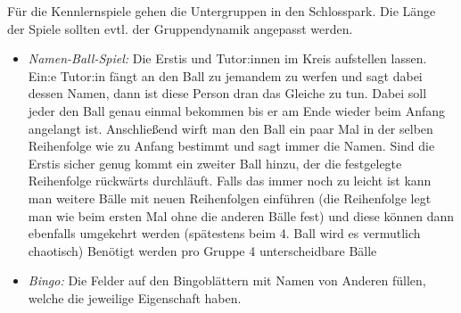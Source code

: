 \documentclass[10pt,ngerman]{scrartcl}
\begin{document}
\begin{multicols}{2}
Für die Kennlernspiele gehen die Untergruppen in den Schlosspark. Die Länge der
Spiele sollten evtl. der Gruppendynamik angepasst werden.  
\begin{itemize}
    \item \emph{Namen-Ball-Spiel:} Die Erstis und Tutor:innen im  Kreis
        aufstellen lassen.  Ein:e Tutor:in fängt an den Ball zu jemandem zu
        werfen und sagt dabei dessen Namen,  dann ist diese Person dran das
        Gleiche zu tun. Dabei soll jeder den Ball genau einmal bekommen bis er
        am Ende wieder beim Anfang angelangt ist. Anschließend wirft man den
        Ball ein paar Mal in der selben Reihenfolge wie zu Anfang bestimmt und
        sagt immer die Namen.  Sind die Erstis sicher genug kommt ein zweiter
        Ball hinzu,  der die festgelegte Reihenfolge rückwärts durchläuft.
        Falls das immer noch zu leicht ist kann man weitere Bälle mit neuen
        Reihenfolgen einführen (die Reihenfolge legt man wie beim ersten Mal
        ohne die anderen Bälle fest) und diese können dann  ebenfalls umgekehrt
        werden (spätestens beim 4.  Ball wird es vermutlich chaotisch) Benötigt
        werden  pro Gruppe 4 unterscheidbare Bälle 
    \item \emph{Bingo:} 
        Die Felder auf den  Bingoblättern mit Namen von
        Anderen füllen, welche die jeweilige Eigenschaft haben.


\end{itemize}
\end{multicols}
\end{document}
